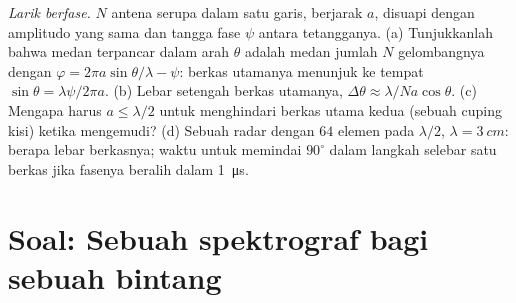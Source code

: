 \begin{exercise}[$\star\star\star$]\label{exo:b2:gratings:12}
\emph{Larik berfase.} $N$ antena serupa dalam satu garis, berjarak $a$, disuapi
dengan amplitudo yang sama dan tangga fase $\psi$ antara tetangganya. (a)
Tunjukkanlah bahwa medan terpancar dalam arah $\theta$ adalah medan
jumlah $N$ gelombangnya dengan $\varphi = 2\pi a\sin\theta/\lambda - \psi$: berkas utamanya menunjuk
ke tempat $\sin\theta = \lambda\psi/2\pi a$. (b) Lebar setengah berkas utamanya, $\Delta\theta
\approx \lambda/Na\cos\theta$. (c) Mengapa harus $a \le \lambda/2$ untuk menghindari berkas utama kedua
(sebuah cuping kisi) ketika mengemudi? (d) Sebuah radar dengan $64$ elemen pada
$\lambda/2$, $\lambda = \qty{3}{cm}$: berapa lebar berkasnya; waktu untuk memindai $90^\circ$ dalam langkah selebar satu
berkas jika fasenya beralih dalam \qty{1}{\micro s}.
\end{exercise}

\section{Soal: Sebuah spektrograf bagi sebuah bintang}

